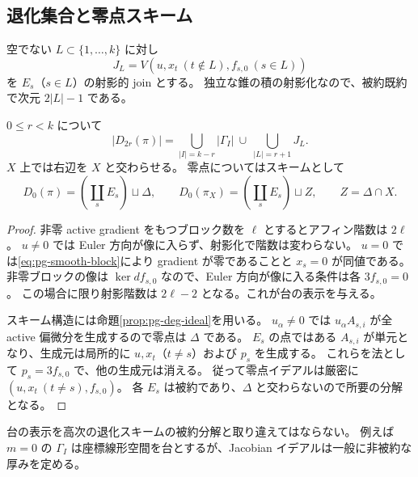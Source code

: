 \subsection{退化集合と零点スキーム}
空でない $L\subset\{1,\ldots,k\}$ に対し
\begin{equation}
J_L=V(u,x_t\ (t\notin L),f_{s,0}\ (s\in L))
\end{equation}
を $E_s$（$s\in L$）の射影的 join とする。
独立な錐の積の射影化なので、被約既約で次元 $2|L|-1$ である。
\begin{proposition}\label{prop:pg-deg-support}
$0\leq r<k$ について
\begin{equation}
|D_{2r}(\pi)|=\bigcup_{|I|=k-r}|\Gamma_I|\ \cup\ \bigcup_{|L|=r+1}J_L.
\end{equation}
$X$ 上では右辺を $X$ と交わらせる。
零点についてはスキームとして
\begin{equation}
D_0(\pi)=\left(\coprod_sE_s\right)\sqcup\Delta,
\qquad D_0(\pi_X)=\left(\coprod_sE_s\right)\sqcup Z,
\qquad Z=\Delta\cap X.
\end{equation}
\end{proposition}
\begin{proof}
非零 active gradient をもつブロック数を $\ell$ とするとアフィン階数は $2\ell$。
$u\neq0$ では Euler 方向が像に入らず、射影化で階数は変わらない。
$u=0$ では\eqref{eq:pg-smooth-block}により gradient が零であることと $x_s=0$ が同値である。
非零ブロックの像は $\ker df_{s,0}$ なので、Euler 方向が像に入る条件は各 $3f_{s,0}=0$。
この場合に限り射影階数は $2\ell-2$ となる。これが台の表示を与える。

スキーム構造には命題\ref{prop:pg-deg-ideal}を用いる。
$u_\alpha\neq0$ では $u_\alpha A_{s,i}$ が全 active 偏微分を生成するので零点は $\Delta$ である。
$E_s$ の点ではある $A_{s,i}$ が単元となり、生成元は局所的に $u,x_t$（$t\neq s$）および $p_s$ を生成する。
これらを法として $p_s=3f_{s,0}$ で、他の生成元は消える。
従って零点イデアルは厳密に $(u,x_t\ (t\neq s),f_{s,0})$。
各 $E_s$ は被約であり、$\Delta$ と交わらないので所要の分解となる。
\end{proof}
\begin{remark}
台の表示を高次の退化スキームの被約分解と取り違えてはならない。
例えば $m=0$ の $\Gamma_I$ は座標線形空間を台とするが、Jacobian イデアルは一般に非被約な厚みを定める。
\end{remark}

